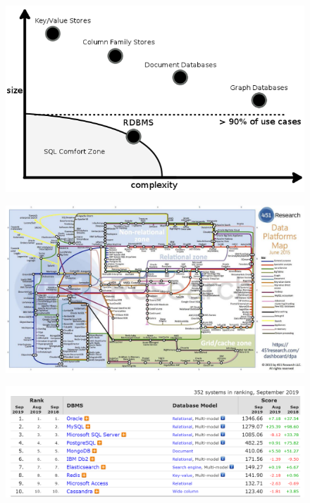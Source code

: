 \documentclass[]{book}
\begin{document}
\begin{figure}
\centering
\includegraphics{images/TiposBBDDNoSQL2.png}
\caption{}
\end{figure}

\begin{figure}
\centering
\includegraphics{images/451ResearchMap.png}
\caption{}
\end{figure}

\begin{figure}
\centering
\includegraphics{images/DBEnginesRanking.png}
\caption{}
\end{figure}
\end{document}
